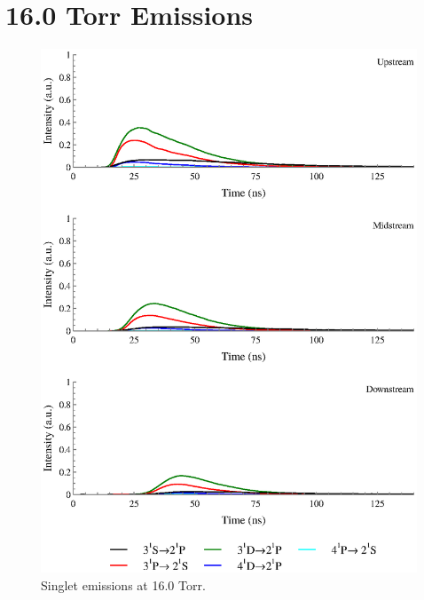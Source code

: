\section{16.0 Torr Emissions}
\begin{figure}
  \centering
  \includegraphics{./chapters/extraem/figures/16torr_s.eps}
  \caption{Singlet emissions at 16.0 Torr.}
\end{figure}
